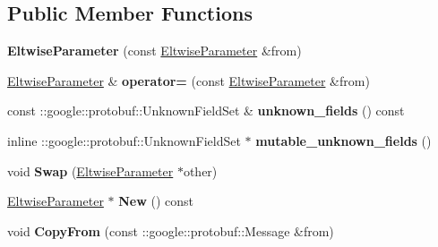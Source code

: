 \subsection*{Public Member Functions}
\begin{DoxyCompactItemize}
\item 
\mbox{\label{classcaffe_1_1_eltwise_parameter_a7d4c4ff10f8ba9753dbf772c47b5748d}} 
{\bfseries Eltwise\+Parameter} (const \mbox{\hyperlink{classcaffe_1_1_eltwise_parameter}{Eltwise\+Parameter}} \&from)
\item 
\mbox{\label{classcaffe_1_1_eltwise_parameter_a4376fc60e00a4eb557c1e60659805965}} 
\mbox{\hyperlink{classcaffe_1_1_eltwise_parameter}{Eltwise\+Parameter}} \& {\bfseries operator=} (const \mbox{\hyperlink{classcaffe_1_1_eltwise_parameter}{Eltwise\+Parameter}} \&from)
\item 
\mbox{\label{classcaffe_1_1_eltwise_parameter_a3705269fd06c91a1819f082bebe3ac4a}} 
const \+::google\+::protobuf\+::\+Unknown\+Field\+Set \& {\bfseries unknown\+\_\+fields} () const
\item 
\mbox{\label{classcaffe_1_1_eltwise_parameter_a42c0eef054e8446734eb549ab85503f0}} 
inline \+::google\+::protobuf\+::\+Unknown\+Field\+Set $\ast$ {\bfseries mutable\+\_\+unknown\+\_\+fields} ()
\item 
\mbox{\label{classcaffe_1_1_eltwise_parameter_afac0d7fde0b1bd17cc1ab11369ced366}} 
void {\bfseries Swap} (\mbox{\hyperlink{classcaffe_1_1_eltwise_parameter}{Eltwise\+Parameter}} $\ast$other)
\item 
\mbox{\label{classcaffe_1_1_eltwise_parameter_ae6d22ef661d62210c3335c06f865741d}} 
\mbox{\hyperlink{classcaffe_1_1_eltwise_parameter}{Eltwise\+Parameter}} $\ast$ {\bfseries New} () const
\item 
\mbox{\label{classcaffe_1_1_eltwise_parameter_a966c4d0e26b05f22bb8b07d56007a50b}} 
void {\bfseries Copy\+From} (const \+::google\+::protobuf\+::\+Message \&from)
\item 
\mbox{\label{classcaffe_1_1_eltwise_parameter_a4a52012aba458e7bc828449cef4a24ec}} 

\end{DoxyCompactItemize}

